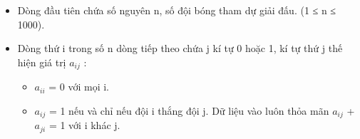 \begin{itemize}
	\item Dòng đầu tiên chứa số nguyên n, số đội bóng tham dự giải đấu. (1 ≤ n ≤ 1000).
	\item Dòng thứ i trong số n dòng tiếp theo chứa j kí tự 0 hoặc 1, kí tự thứ j thế hiện giá trị $a_{ij}$ :
\begin{itemize}
	\item $a_{ii}$ = 0 với mọi i.
	\item $a_{ij}$ = 1 nếu và chỉ nếu đội i thắng đội j. Dữ liệu vào luôn thỏa mãn $a_{ij}$ +$a_{ji}$ = 1 với i khác j.
\end{itemize}
\end{itemize}